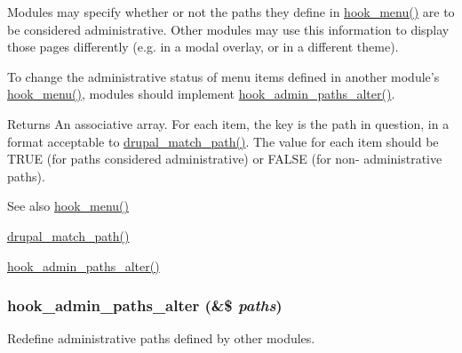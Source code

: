 Modules may specify whether or not the paths they define in \hyperlink{group__hooks_ga5c95244fea59b25666e409759e133ded}{hook\_\-menu()} are to be considered administrative. Other modules may use this information to display those pages differently (e.g. in a modal overlay, or in a different theme).

To change the administrative status of menu items defined in another module's \hyperlink{group__hooks_ga5c95244fea59b25666e409759e133ded}{hook\_\-menu()}, modules should implement \hyperlink{group__hooks_ga027fc321194ec7bbc226ed6aff587e68}{hook\_\-admin\_\-paths\_\-alter()}.

\begin{DoxyReturn}{Returns}
An associative array. For each item, the key is the path in question, in a format acceptable to \hyperlink{path_8inc_a1299e390360982cc8fbebe06f0232e18}{drupal\_\-match\_\-path()}. The value for each item should be TRUE (for paths considered administrative) or FALSE (for non-\/ administrative paths).
\end{DoxyReturn}
\begin{DoxySeeAlso}{See also}
\hyperlink{group__hooks_ga5c95244fea59b25666e409759e133ded}{hook\_\-menu()} 

\hyperlink{path_8inc_a1299e390360982cc8fbebe06f0232e18}{drupal\_\-match\_\-path()} 

\hyperlink{group__hooks_ga027fc321194ec7bbc226ed6aff587e68}{hook\_\-admin\_\-paths\_\-alter()} 
\end{DoxySeeAlso}
\hypertarget{group__hooks_ga027fc321194ec7bbc226ed6aff587e68}{
\subsubsection[{hook\_\-admin\_\-paths\_\-alter}]{\setlength{\rightskip}{0pt plus 5cm}hook\_\-admin\_\-paths\_\-alter (\&\$ {\em paths})}}
\label{group__hooks_ga027fc321194ec7bbc226ed6aff587e68}
Redefine administrative paths defined by other modules.


